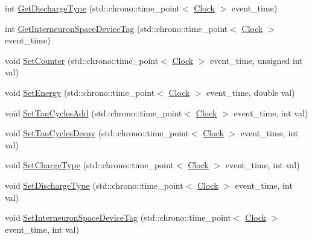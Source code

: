 \begin{DoxyCompactItemize}
int \mbox{\hyperlink{classInterneuronSpace_ae65bf091b84fa11459ef754ed1c7bf21}{Get\+Discharge\+Type}} (std\+::chrono\+::time\+\_\+point$<$ \mbox{\hyperlink{universe_8h_a0ef8d951d1ca5ab3cfaf7ab4c7a6fd80}{Clock}} $>$ event\+\_\+time)
\item 
int \mbox{\hyperlink{classInterneuronSpace_a66b6683bab6872dfece6111a8ccfb1d7}{Get\+Interneuron\+Space\+Device\+Tag}} (std\+::chrono\+::time\+\_\+point$<$ \mbox{\hyperlink{universe_8h_a0ef8d951d1ca5ab3cfaf7ab4c7a6fd80}{Clock}} $>$ event\+\_\+time)
\item 
void \mbox{\hyperlink{classInterneuronSpace_a60a46f22a2e575d65031635a698a60a9}{Set\+Counter}} (std\+::chrono\+::time\+\_\+point$<$ \mbox{\hyperlink{universe_8h_a0ef8d951d1ca5ab3cfaf7ab4c7a6fd80}{Clock}} $>$ event\+\_\+time, unsigned int val)
\item 
void \mbox{\hyperlink{classInterneuronSpace_a65ecd1914ab039707313beb1b8702e68}{Set\+Energy}} (std\+::chrono\+::time\+\_\+point$<$ \mbox{\hyperlink{universe_8h_a0ef8d951d1ca5ab3cfaf7ab4c7a6fd80}{Clock}} $>$ event\+\_\+time, double val)
\item 
void \mbox{\hyperlink{classInterneuronSpace_ad6c1387daa261a3e8e1dba1402101d5c}{Set\+Tau\+Cycles\+Add}} (std\+::chrono\+::time\+\_\+point$<$ \mbox{\hyperlink{universe_8h_a0ef8d951d1ca5ab3cfaf7ab4c7a6fd80}{Clock}} $>$ event\+\_\+time, int val)
\item 
void \mbox{\hyperlink{classInterneuronSpace_a7f44a965e377ecdc5c387af2b5d30d69}{Set\+Tau\+Cycles\+Decay}} (std\+::chrono\+::time\+\_\+point$<$ \mbox{\hyperlink{universe_8h_a0ef8d951d1ca5ab3cfaf7ab4c7a6fd80}{Clock}} $>$ event\+\_\+time, int val)
\item 
void \mbox{\hyperlink{classInterneuronSpace_a404aacb1adce30288bb7b4237344e4cc}{Set\+Charge\+Type}} (std\+::chrono\+::time\+\_\+point$<$ \mbox{\hyperlink{universe_8h_a0ef8d951d1ca5ab3cfaf7ab4c7a6fd80}{Clock}} $>$ event\+\_\+time, int val)
\item 
void \mbox{\hyperlink{classInterneuronSpace_a7fc404aae98d45ccad26b5c186fab6e2}{Set\+Discharge\+Type}} (std\+::chrono\+::time\+\_\+point$<$ \mbox{\hyperlink{universe_8h_a0ef8d951d1ca5ab3cfaf7ab4c7a6fd80}{Clock}} $>$ event\+\_\+time, int val)
\item 
void \mbox{\hyperlink{classInterneuronSpace_ab34d72ef9135288690328217d7c0a388}{Set\+Interneuron\+Space\+Device\+Tag}} (std\+::chrono\+::time\+\_\+point$<$ \mbox{\hyperlink{universe_8h_a0ef8d951d1ca5ab3cfaf7ab4c7a6fd80}{Clock}} $>$ event\+\_\+time, int val)
\item 

\end{DoxyCompactItemize}
